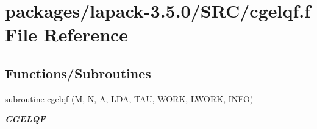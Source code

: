 \hypertarget{cgelqf_8f}{}\section{packages/lapack-\/3.5.0/\+S\+R\+C/cgelqf.f File Reference}
\label{cgelqf_8f}
\subsection*{Functions/\+Subroutines}
\begin{DoxyCompactItemize}
\item 
subroutine \hyperlink{group__complexGEcomputational_gad670e88141738afef1b5580a33e6750f}{cgelqf} (M, \hyperlink{polmisc_8c_a0240ac851181b84ac374872dc5434ee4}{N}, \hyperlink{classA}{A}, \hyperlink{example__user_8c_ae946da542ce0db94dced19b2ecefd1aa}{L\+D\+A}, T\+A\+U, W\+O\+R\+K, L\+W\+O\+R\+K, I\+N\+F\+O)
\begin{DoxyCompactList}\small\item\em {\bfseries C\+G\+E\+L\+Q\+F} \end{DoxyCompactList}\end{DoxyCompactItemize}
